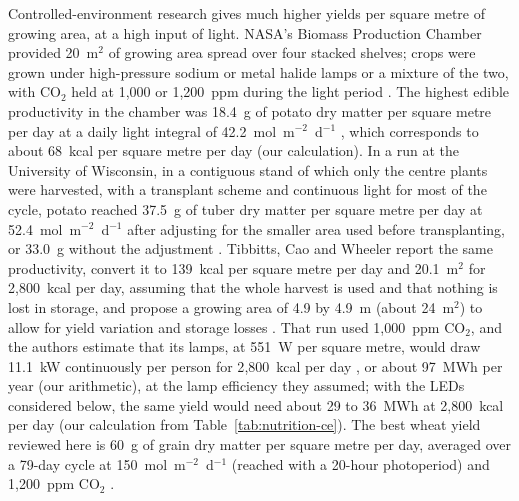 Controlled-environment research gives much higher yields per square metre of growing area, at a high input of light. NASA's Biomass Production Chamber provided 20~m$^2$ of growing area spread over four stacked shelves; crops were grown under high-pressure sodium or metal halide lamps or a mixture of the two, with CO$_2$ held at 1{,}000 or 1{,}200~ppm during the light period \cite[Section~2.1, pp.~707--708]{wheeler2008crop}. The highest edible productivity in the chamber was 18.4~g of potato dry matter per square metre per day at a daily light integral of 42.2~mol~m$^{-2}$~d$^{-1}$ \cite[Table~2, p.~711]{wheeler2008crop}, which corresponds to about 68~kcal per square metre per day (our calculation). In a run at the University of Wisconsin, in a contiguous stand of which only the centre plants were harvested, with a transplant scheme and continuous light for most of the cycle, potato reached 37.5~g of tuber dry matter per square metre per day at 52.4~mol~m$^{-2}$~d$^{-1}$ after adjusting for the smaller area used before transplanting, or 33.0~g without the adjustment \cite[p.~82; Table~1, p.~83; p.~84]{wheeler2006potato}. Tibbitts, Cao and Wheeler report the same productivity, convert it to 139~kcal per square metre per day and 20.1~m$^2$ for 2{,}800~kcal per day, assuming that the whole harvest is used and that nothing is lost in storage, and propose a growing area of 4.9 by 4.9~m (about 24~m$^2$) to allow for yield variation and storage losses \cite[p.~iv; p.~30]{tibbitts1994potato}. That run used 1{,}000~ppm CO$_2$, and the authors estimate that its lamps, at 551~W per square metre, would draw 11.1~kW continuously per person for 2{,}800~kcal per day \cite[pp.~28--31]{tibbitts1994potato}, or about 97~MWh per year (our arithmetic), at the lamp efficiency they assumed; with the LEDs considered below, the same yield would need about 29 to 36~MWh at 2{,}800~kcal per day (our calculation from Table~\ref{tab:nutrition-ce}). The best wheat yield reviewed here is 60~g of grain dry matter per square metre per day, averaged over a 79-day cycle at 150~mol~m$^{-2}$~d$^{-1}$ (reached with a 20-hour photoperiod) and 1{,}200~ppm CO$_2$ \cite[Abstract, p.~869; Table~I, p.~871]{bugbee1988limits}.

